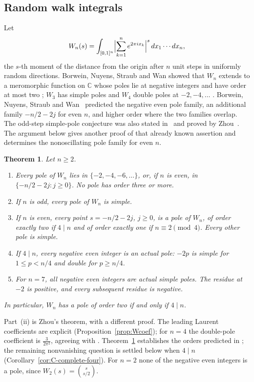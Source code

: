 \documentclass[11pt]{amsart}
\newtheorem{theorem}{Theorem}
\theoremstyle{definition}
\newcommand{\C}{\mathbb C}
\begin{document}
\subsection{Random walk integrals}
Let
\[
W_n(s)=\int_{[0,1]^n}\Bigl|\sum_{k=1}^ne^{2\pi ix_k}\Bigr|^s\,dx_1\cdots dx_n,
\]
the $s$-th moment of the distance from the origin after $n$ unit steps in uniformly random directions. Borwein, Nuyens, Straub and Wan showed that $W_n$ extends to a meromorphic function on $\C$ whose poles lie at negative integers and have order at most two \cite[Thm.~5]{BNSW11}; $W_3$ has simple poles and $W_4$ double poles at $-2,-4,\dots$ \cite{BNSW11,BSWZ12}. Borwein, Nuyens, Straub and Wan~\cite[Remark~5]{BNSW11}
predicted the negative even pole family, an additional family
$-n/2-2j$ for even $n$, and higher order where the two families overlap.
The odd-step simple-pole conjecture was also stated in~\cite{BSW13}
and proved by Zhou~\cite[Theorem~5.2]{Zho19}.  The argument below gives
another proof of that already known assertion and determines the
nonoscillating pole family for even $n$.

\begin{theorem}\label{thm:C}
Let $n\ge2$.
\begin{enumerate}[label=\textup{(\roman*)}]
\item Every pole of $W_n$ lies in $\{-2,-4,-6,\dots\}$, or, if $n$ is even, in $\{-n/2-2j:j\ge0\}$. No pole has order three or more.
\item If $n$ is odd, every pole of $W_n$ is simple.
\item If $n$ is even, every point $s=-n/2-2j$, $j\ge0$, is a pole of $W_n$, of order exactly two if $4\mid n$ and of order exactly one if $n\equiv2\pmod4$. Every other pole is simple.
\item If $4\mid n$, every negative even integer is an actual pole:
$-2p$ is simple for $1\le p<n/4$ and double for $p\ge n/4$.
\item For $n=7$, all negative even integers are actual simple poles.
The residue at $-2$ is positive, and every subsequent residue is negative.
\end{enumerate}
In particular, $W_n$ has a pole of order two if and only if $4\mid n$.
\end{theorem}

Part~(ii) is Zhou's theorem, with a different proof. The leading Laurent coefficients are explicit (Proposition~\ref{prop:Wcoef}); for $n=4$ the double-pole coefficient is $\frac3{2\pi^2}$, agreeing with \cite[Example~4]{BSWZ12}. Theorem~\ref{thm:C} establishes the orders predicted in \cite[Rem.~5]{BNSW11}; the remaining nonvanishing question is settled below when $4\mid n$ (Corollary~\ref{cor:C-complete-four}). For $n=2$ none of the negative even integers is a pole, since $W_2(s)=\binom{s}{s/2}$.
\end{document}
